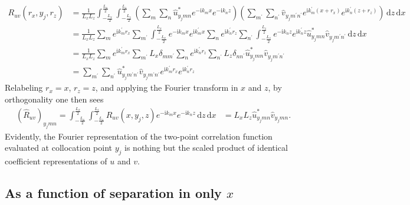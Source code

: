 \documentclass[letterpaper,11pt,nointlimits,reqno]{amsart}
\newcommand{\ii}{\ensuremath{\mathrm{i}}}
\begin{document}
\begin{align}
R_{uv} \left( r_x, y_j, r_z \right)
  &= \frac{1}{L_x L_z}
     \int_{-\frac{L_x}{2}}^{\frac{L_x}{2}}
     \int_{-\frac{L_z}{2}}^{\frac{L_z}{2}}
        \left(
         \sum_{m}\sum_{n}
         \hat{u}^\ast_{y_j m n}
         e^{-\ii k_m x}e^{-\ii k_n z}
       \right)
       \left(
         \sum_{m^\prime}\sum_{n^\prime}
         \hat{v}_{y_j m^\prime n^\prime}
         e^{\ii k_m^\prime \left(x+r_x\right)}e^{\ii k_n^\prime \left(z+r_z\right)}
       \right)
     \,\mathrm{d}z
     \,\mathrm{d}x
\\
  &= \frac{1}{L_x L_z}
     \sum_{m}
     e^{\ii k_m^\prime r_x}
     \sum_{m^\prime}
     \int_{-\frac{L_x}{2}}^{\frac{L_x}{2}}
     e^{-\ii k_m x} e^{\ii k_m^\prime x}
     \sum_{n}
     e^{\ii k_n^\prime r_z}
     \sum_{n^\prime}
     \int_{-\frac{L_z}{2}}^{\frac{L_z}{2}}
     e^{-\ii k_n z} e^{\ii k_n^\prime z}
     \hat{u}^\ast_{y_j m n}
     \hat{v}_{y_j m^\prime n^\prime}
     \,\mathrm{d}z
     \,\mathrm{d}x
\\
  &= \frac{1}{L_x L_z}
     \sum_{m}
     e^{\ii k_m^\prime r_x}
     \sum_{m^\prime}
     L_x \delta_{m m^\prime}
     \sum_{n}
     e^{\ii k_n^\prime r_z}
     \sum_{n^\prime}
     L_z \delta_{n n^\prime}
     \hat{u}^\ast_{y_j m n}
     \hat{v}_{y_j m^\prime n^\prime}
\\
  &= \sum_{m^\prime}
     \sum_{n^\prime}
     \hat{u}^\ast_{y_j m^\prime n^\prime}
     \hat{v}_{y_j m^\prime n^\prime}
     e^{\ii k_m^\prime r_x}
     e^{\ii k_n^\prime r_z}
    \label{eq:twopointxz_physical}
\end{align}
Relabeling $r_x = x$, $r_z = z$, and applying the Fourier transform in $x$ and
$z$, by orthogonality one then sees
\begin{align}
\left(\hat{R}_{uv}\right)_{y_j m n}
    =
    \int_{-\frac{L_x}{2}}^{\frac{L_x}{2}}
    \int_{-\frac{L_z}{2}}^{\frac{L_z}{2}}
    R_{uv} \left( x, y_j, z \right)
    e^{-\ii k_m x}
    e^{-\ii k_n z}
    \,\mathrm{d}z
    \,\mathrm{d}x
    &=
    L_x L_z
    \hat{u}^\ast_{y_j m n}
    \hat{v}_{y_j m n}.
    \label{eq:twopointxz_wave}
\end{align}
Evidently, the Fourier representation of the two-point correlation function
evaluated at collocation point $y_j$ is nothing but the scaled product of
identical coefficient representations of $u$ and $v$.

\subsection{As a function of separation in only $x$}
\end{document}
